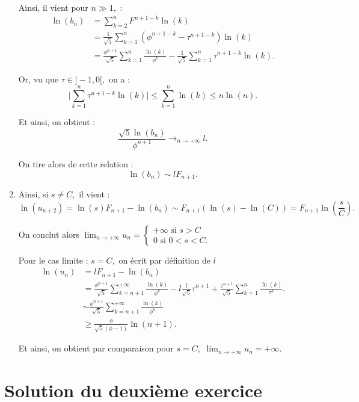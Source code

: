 \begin{enumerate}
Ainsi, il vient pour $n\gg 1,$ : 
\begin{align*}
\ln(b_{n}) & = \sum_{k=2}^{n}F^{n+1-k}\ln(k)\\
& =\frac{1}{\sqrt{5}}\sum_{k=1}^{n}\left(\phi^{n+1-k}-\tau^{n+1-k}\right)\ln(k)\\
& =\frac{\phi^{n+1}}{\sqrt{5}}\sum_{k=1}^{n}\frac{\ln(k)}{\phi^{k}}-\frac{1}{\sqrt{5}}\sum_{k=1}^{n}\tau^{n+1-k}\ln(k).
\end{align*}

Or, vu que $\tau\in]-1,0[,$ on a : $$\vert \sum_{k=1}^{n}\tau^{n+1-k}\ln(k) \vert \leq \sum_{k=1}^{n}\ln(k) \leq n\ln(n).$$

Et ainsi, on obtient  : $$\frac{\sqrt{5}\ln(b_{n})}{\phi^{n+1}}\longrightarrow_{n\rightarrow +\infty} l.$$

On tire alors de cette relation : $$\ln(b_{n})\sim l F_{n+1}.$$

\item Ainsi, si $s \neq C,$ il vient : 
$$\ln(u_{n+2})=\ln(s)F_{n+1}-\ln(b_{n})\sim F_{n+1}\left(\ln(s)-\ln(C)\right)=F_{n+1}\ln(\frac{s}{C}).$$

On conclut alors $\displaystyle \lim_{n\rightarrow +\infty} u_{n}= \left\{ \begin{array}{l}
+\infty \mbox{ si } s>C\\
0 \mbox{ si } 0<s<C.
\end{array}\right.$

Pour le cas limite : $s=C,$ on écrit par définition de $l$
\begin{align*}
\ln(u_{n}) & =lF_{n+1}-\ln(b_{n})\\
& = \frac{\phi^{n+1}}{\sqrt{5}}\sum_{k=n+1}^{+\infty}\frac{\ln(k)}{\phi^{k}}-l\frac{l}{\sqrt{5}}\tau^{n+1}+\frac{\tau^{n+1}}{\sqrt{5}}\sum_{k=1}^{n}\frac{\ln(k)}{\tau^{k}}.\\
& \sim \frac{\phi^{n+1}}{\sqrt{5}}\sum_{k=n+1}^{+\infty}\frac{\ln(k)}{\phi^{k}}\\
& \geq \frac{\phi}{\sqrt{5}(\phi-1)}\ln(n+1).
\end{align*}

Et ainsi, on obtient par comparaison pour $s=C,$ $\displaystyle \lim_{n\rightarrow +\infty}u_{n}=+\infty.$

\end{enumerate}

\section{Solution du deuxième exercice}

